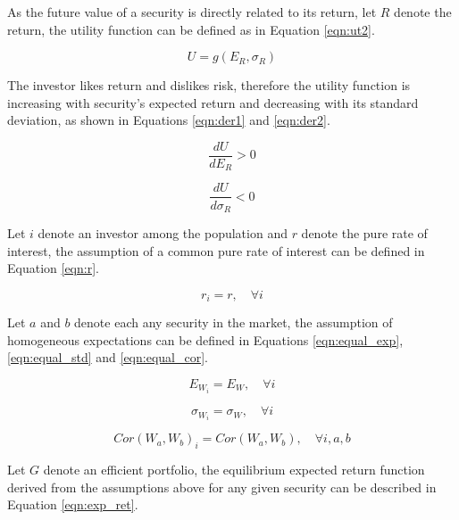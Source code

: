 \documentclass[cic,tc, english]{iiufrgs}
\begin{document}
    As the future value of a security is directly related to its return, let $R$ denote the return, the utility function can be defined as in Equation \ref{eqn:ut2}.

    \begin{equation}
        \label{eqn:ut2}
        U = g(E_R, \sigma_R)
    \end{equation}

    The investor likes return and dislikes risk, therefore the utility function is increasing with security's expected return and decreasing with its standard deviation, as shown in Equations \ref{eqn:der1} and \ref{eqn:der2}.
    
    \begin{equation}
        \label{eqn:der1}
        \frac{dU}{dE_R} > 0
    \end{equation}

    \begin{equation}
        \label{eqn:der2}
        \frac{dU}{d\sigma_R} < 0
    \end{equation}

    Let $i$ denote an investor among the population and $r$ denote the pure rate of interest, the assumption of a common pure rate of interest can be defined in Equation \ref{eqn:r}.

    \begin{equation}
        \label{eqn:r}
        r_i = r, \quad \forall i
    \end{equation}

    Let $a$ and $b$ denote each any security in the market, the assumption of homogeneous expectations can be defined in Equations \ref{eqn:equal_exp}, \ref{eqn:equal_std} and \ref{eqn:equal_cor}.

    \begin{equation}
        \label{eqn:equal_exp}
        E_{W_i} = E_W, \quad \forall i
    \end{equation}

    \begin{equation}
        \label{eqn:equal_std}
        \sigma_{W_i} = \sigma_W, \quad \forall i
    \end{equation}

    \begin{equation}
        \label{eqn:equal_cor}
        Cor(W_a, W_b)_i = Cor(W_a, W_b), \quad \forall i, a, b
    \end{equation}

    Let $G$ denote an efficient portfolio, the equilibrium expected return function derived from the assumptions above for any given security can be described in Equation \ref{eqn:exp_ret}.
\end{document}
